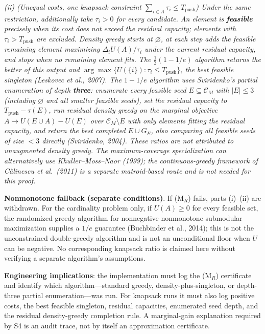 \documentclass[
  11pt]{article}
\begin{document}
\emph{(ii) (Unequal costs, one knapsack constraint
\(\sum_{i\in A}\tau_i\le T_{\mathrm{push}}\)) Under the same
restriction, additionally take \(\tau_i>0\) for every candidate. An
element is \textbf{feasible} precisely when its cost does not exceed the
residual capacity; elements with \(\tau_i>T_{\mathrm{push}}\) are
excluded. Density greedy starts at \(\varnothing\), at each step adds
the feasible remaining element maximizing \(\Delta_iU(A)/\tau_i\) under
the current residual capacity, and stops when no remaining element fits.
The \(\tfrac12(1-1/e)\) algorithm returns the better of this output and
\(\arg\max\{U(\{i\}):\tau_i\le T_{\mathrm{push}}\}\), the best feasible
singleton (Leskovec et al., 2007). The \(1-1/e\) algorithm uses
Sviridenko's partial enumeration of depth \textbf{three}: enumerate
every feasible seed \(E\subseteq\mathcal C_M\) with \(|E|\le3\)
(including \(\varnothing\) and all smaller feasible seeds), set the
residual capacity to \(T_{\mathrm{push}}-\tau(E)\), run residual density
greedy on the marginal objective \(A\mapsto U(E\cup A)-U(E)\) over
\(\mathcal C_M\setminus E\) with only elements fitting the residual
capacity, and return the best completed \(E\cup G_E\), also comparing
all feasible seeds of size \(<3\) directly (Sviridenko, 2004). These
ratios are not attributed to unaugmented density greedy. The
maximum-coverage specialization can alternatively use
Khuller--Moss--Naor (1999); the continuous-greedy framework of Călinescu
et al.~(2011) is a separate matroid-based route and is not needed for
this proof.}

\textbf{Nonmonotone fallback (separate conditions)}. If (M\(_R\)) fails,
parts (i)--(ii) are withdrawn. For the cardinality problem only, if
\(U(A)\ge0\) for every feasible set, the randomized greedy algorithm for
nonnegative nonmonotone submodular maximization supplies a \(1/e\)
guarantee (Buchbinder et al., 2014); this is not the unconstrained
double-greedy algorithm and is not an unconditional floor when \(U\) can
be negative. No corresponding knapsack ratio is claimed here without
verifying a separate algorithm's assumptions.

\textbf{Engineering implications}: the implementation must log the
(M\(_R\)) certificate and identify which algorithm---standard greedy,
density-plus-singleton, or depth-three partial enumeration---was run.
For knapsack runs it must also log positive costs, the best feasible
singleton, residual capacities, enumerated seed depth, and the residual
density-greedy completion rule. A marginal-gain explanation required by
S4 is an audit trace, not by itself an approximation certificate.
\end{document}

